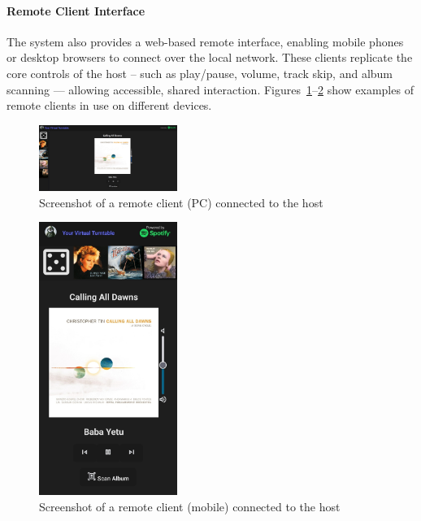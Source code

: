             \paragraph{Remote Client Interface}
    
            The system also provides a web-based remote interface, enabling mobile phones or desktop browsers to connect over the local network. These clients replicate the core controls of the host -- such as play/pause, volume, track skip, and album scanning — allowing accessible, shared interaction. Figures~\ref{fig:laptop}–\ref{fig:phone} show examples of remote clients in use on different devices.
    
            \begin{figure}[h]
                \centering
                \includegraphics[width=0.4\textwidth]{images/screenshots/LAPTOP.png}
                \caption{Screenshot of a remote client (PC) connected to the host}
                \label{fig:laptop}
            \end{figure}
            
            \begin{figure}[h]
                \centering
                \includegraphics[width=0.4\textwidth]{images/screenshots/PHONE.jpg}
                \caption{Screenshot of a remote client (mobile) connected to the host}
                \label{fig:phone}
            \end{figure}
    
